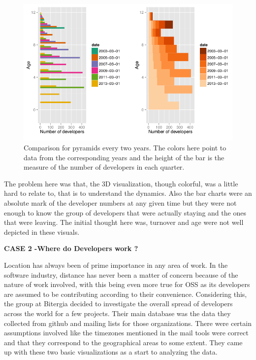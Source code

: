 \documentclass[seploa]{beavtex}
\begin{document}
\begin{figure}[!ht]
\centering
\includegraphics[width=130mm]{age1.png}
\caption{Comparison for pyramids every two years. The colors here point to data from the corresponding years and the height of the bar is the measure of the number of developers in each quarter.}
\end{figure}

The problem here was that, the 3D visualization, though colorful, was a little hard to relate to, that is to understand the dynamics. Also the bar charts were an absolute mark of the developer numbers at any given time but they were not enough to know the group of developers that were actually staying and the ones that were leaving. The initial thought here was, turnover and age were not well depicted in these visuals.

 \textbf{CASE 2 -Where do Developers work ?}

Location has always been of prime importance in any area of work. In the software industry, distance has never been a matter of concern because of the nature of work involved, with this being even more true for OSS as its developers are assumed to be contributing according to their convenience\cite{yuri2010}. Considering this, the group at Bitergia decided to investigate the overall spread of developers across the world for a few projects. Their main database was the data they collected from github and mailing lists for those organizations. There were certain assumptions involved like the timezones mentioned in the mail tools were correct and that they correspond to the geographical areas to some extent. They came up with these two basic visualizations as a start to analyzing the data.
\end{document}
